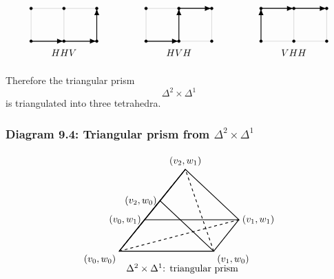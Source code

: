 \documentclass[12pt,a4paper]{article}
\theoremstyle{notespace}
\begin{document}
\[
\begin{tikzpicture}[scale=1.2]
	\draw[step=1,gray!50,thin] (0,0) grid (2,1);
	\foreach \x in {0,1,2}{
		\foreach \y in {0,1}{
			\filldraw (\x,\y) circle (1.2pt);
		}
	}
	\draw[-{Latex[length=2.5mm]},thick] (0,0)--(1,0);
	\draw[-{Latex[length=2.5mm]},thick] (1,0)--(2,0);
	\draw[-{Latex[length=2.5mm]},thick] (2,0)--(2,1);
	\node at (1,-0.35) {$HHV$};
	
	\begin{scope}[xshift=3.5cm]
		\draw[step=1,gray!50,thin] (0,0) grid (2,1);
		\foreach \x in {0,1,2}{
			\foreach \y in {0,1}{
				\filldraw (\x,\y) circle (1.2pt);
			}
		}
		\draw[-{Latex[length=2.5mm]},thick] (0,0)--(1,0);
		\draw[-{Latex[length=2.5mm]},thick] (1,0)--(1,1);
		\draw[-{Latex[length=2.5mm]},thick] (1,1)--(2,1);
		\node at (1,-0.35) {$HVH$};
	\end{scope}
	
	\begin{scope}[xshift=7cm]
		\draw[step=1,gray!50,thin] (0,0) grid (2,1);
		\foreach \x in {0,1,2}{
			\foreach \y in {0,1}{
				\filldraw (\x,\y) circle (1.2pt);
			}
		}
		\draw[-{Latex[length=2.5mm]},thick] (0,0)--(0,1);
		\draw[-{Latex[length=2.5mm]},thick] (0,1)--(1,1);
		\draw[-{Latex[length=2.5mm]},thick] (1,1)--(2,1);
		\node at (1,-0.35) {$VHH$};
	\end{scope}
\end{tikzpicture}
\]

Therefore the triangular prism
\[
\Delta^2\times\Delta^1
\]
is triangulated into three tetrahedra.

\subsubsection{Diagram 9.4: Triangular prism from \(\Delta^2\times\Delta^1\)}

\[
\begin{tikzpicture}[scale=1.15]
	\coordinate (A) at (0,0);
	\coordinate (B) at (3,0);
	\coordinate (C) at (1.3,1.6);
	
	\coordinate (A2) at (0.8,1.0);
	\coordinate (B2) at (3.8,1.0);
	\coordinate (C2) at (2.1,2.6);
	
	\draw[thick] (A)--(B)--(C)--cycle;
	\draw[thick] (A2)--(B2)--(C2)--cycle;
	\draw[thick] (A)--(A2);
	\draw[thick] (B)--(B2);
	\draw[thick] (C)--(C2);
	
	\draw[dashed,thick] (A)--(B2);
	\draw[dashed,thick] (A)--(C2);
	\draw[dashed,thick] (B)--(C2);
	
	\node[below left] at (A) {$(v_0,w_0)$};
	\node[below right] at (B) {$(v_1,w_0)$};
	\node[left] at (C) {$(v_2,w_0)$};
	
	\node[left] at (A2) {$(v_0,w_1)$};
	\node[right] at (B2) {$(v_1,w_1)$};
	\node[above] at (C2) {$(v_2,w_1)$};
	
	\node at (2,-0.55) {$\Delta^2\times\Delta^1$: triangular prism};
\end{tikzpicture}
\]
\end{document}
